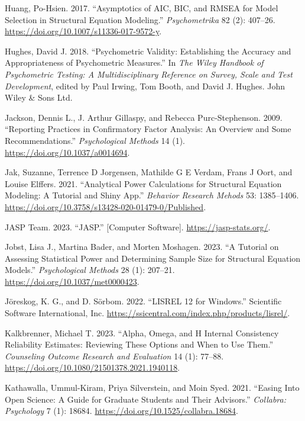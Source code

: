 \documentclass[
  a4paper,
]{article}
\newlength{\cslhangindent}
\newenvironment{CSLReferences}[2] %
 {\begin{list}{}{%
  \setlength{\itemindent}{0pt}
  \setlength{\leftmargin}{0pt}
  \setlength{\parsep}{0pt}
  \ifodd #1
   \setlength{\leftmargin}{\cslhangindent}
   \setlength{\itemindent}{-1\cslhangindent}
  \fi
  \setlength{\itemsep}{#2\baselineskip}}}
 {\end{list}}
\begin{document}
\begin{CSLReferences}{1}{0}
Huang, Po-Hsien. 2017. {``Asymptotics of {AIC}, {BIC}, and {RMSEA} for
{Model Selection} in {Structural Equation Modeling}.''}
\emph{Psychometrika} 82 (2): 407--26.
\url{https://doi.org/10.1007/s11336-017-9572-y}.

Hughes, David J. 2018. {``Psychometric {Validity}: {Establishing} the
{Accuracy} and {Appropriateness} of {Psychometric Measures}.''} In
\emph{The {Wiley Handbook} of {Psychometric Testing}: {A
Multidisciplinary Reference} on {Survey}, {Scale} and {Test
Development}}, edited by Paul Irwing, Tom Booth, and David J. Hughes.
John Wiley \& Sons Ltd.

Jackson, Dennis L., J. Arthur Gillaspy, and Rebecca Purc-Stephenson.
2009. {``Reporting Practices in Confirmatory Factor Analysis: {An}
Overview and Some Recommendations.''} \emph{Psychological Methods} 14
(1). \url{https://doi.org/10.1037/a0014694}.

Jak, Suzanne, Terrence D Jorgensen, Mathilde G E Verdam, Frans J Oort,
and Louise Elffers. 2021. {``Analytical Power Calculations for
Structural Equation Modeling: {A} Tutorial and {Shiny} App.''}
\emph{Behavior Research Mehods} 53: 1385--1406.
\url{https://doi.org/10.3758/s13428-020-01479-0/Published}.

JASP Team. 2023. {``{JASP}.''} {[}Computer Software{]}.
\url{https://jasp-stats.org/}.

Jobst, Lisa J., Martina Bader, and Morten Moshagen. 2023. {``A Tutorial
on Assessing Statistical Power and Determining Sample Size for
Structural Equation Models.''} \emph{Psychological Methods} 28 (1):
207--21. \url{https://doi.org/10.1037/met0000423}.

Jöreskog, K. G., and D. Sörbom. 2022. {``{LISREL} 12 for {Windows}.''}
Scientific Software International, Inc.
\url{https://ssicentral.com/index.php/products/lisrel/}.

Kalkbrenner, Michael T. 2023. {``Alpha, {Omega}, and {H Internal
Consistency Reliability Estimates}: {Reviewing These Options} and {When}
to {Use Them}.''} \emph{Counseling Outcome Research and Evaluation} 14
(1): 77--88. \url{https://doi.org/10.1080/21501378.2021.1940118}.

Kathawalla, Ummul-Kiram, Priya Silverstein, and Moin Syed. 2021.
{``Easing {Into Open Science}: {A Guide} for {Graduate Students} and
{Their Advisors}.''} \emph{Collabra: Psychology} 7 (1): 18684.
\url{https://doi.org/10.1525/collabra.18684}.


\end{CSLReferences}
\end{document}
